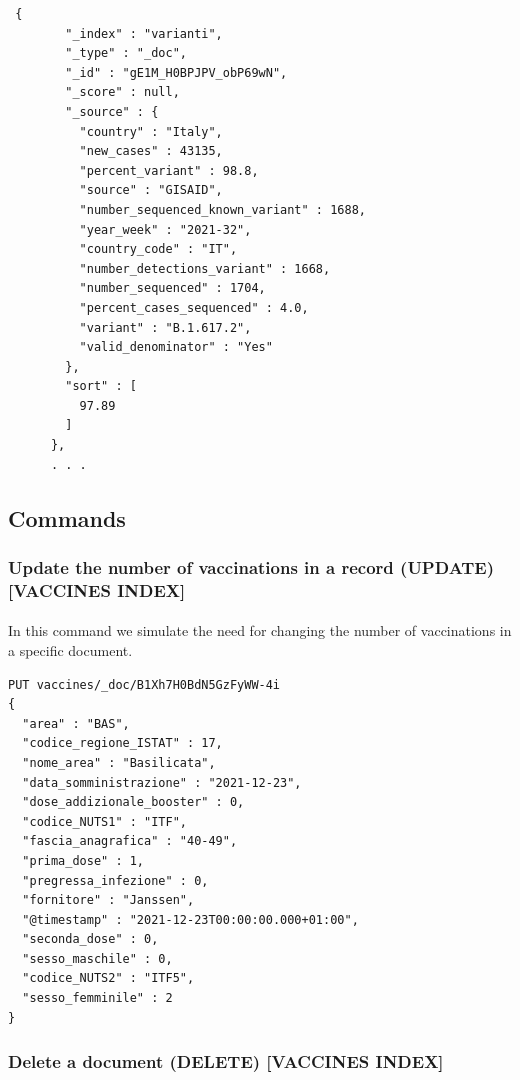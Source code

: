 \documentclass[a4paper,12pt]{article}
\begin{document}
\begin{tcolorbox}[colback=red!5!white,colframe=red!75!black,title=OUTPUT]
\begin{verbatim}
 {
        "_index" : "varianti",
        "_type" : "_doc",
        "_id" : "gE1M_H0BPJPV_obP69wN",
        "_score" : null,
        "_source" : {
          "country" : "Italy",
          "new_cases" : 43135,
          "percent_variant" : 98.8,
          "source" : "GISAID",
          "number_sequenced_known_variant" : 1688,
          "year_week" : "2021-32",
          "country_code" : "IT",
          "number_detections_variant" : 1668,
          "number_sequenced" : 1704,
          "percent_cases_sequenced" : 4.0,
          "variant" : "B.1.617.2",
          "valid_denominator" : "Yes"
        },
        "sort" : [
          97.89
        ]
      },
      . . .
\end{verbatim}
\end{tcolorbox}
\newpage

\subsection{Commands}
\subsubsection{Update the number of vaccinations in a record (UPDATE) [VACCINES INDEX]}
\paragraph{} In this command we simulate the need for changing the number of vaccinations in a specific document.

\begin{tcolorbox}[colback=orange!5!white,colframe=orange!75!black,title=COMMAND]
\begin{verbatim}
PUT vaccines/_doc/B1Xh7H0BdN5GzFyWW-4i
{
  "area" : "BAS",
  "codice_regione_ISTAT" : 17,
  "nome_area" : "Basilicata",
  "data_somministrazione" : "2021-12-23",
  "dose_addizionale_booster" : 0,
  "codice_NUTS1" : "ITF",
  "fascia_anagrafica" : "40-49",
  "prima_dose" : 1,
  "pregressa_infezione" : 0,
  "fornitore" : "Janssen",
  "@timestamp" : "2021-12-23T00:00:00.000+01:00",
  "seconda_dose" : 0,
  "sesso_maschile" : 0,
  "codice_NUTS2" : "ITF5",
  "sesso_femminile" : 2
}
\end{verbatim}
\end{tcolorbox}

\subsubsection{Delete a document (DELETE) [VACCINES INDEX] }
\end{document}
